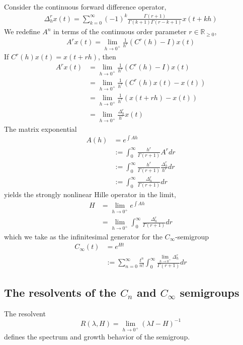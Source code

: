 \documentclass{article}
\newcommand{\R}{\mathbb{R}}
\begin{document}
Consider the continuous forward difference operator,
\begin{align*}
    \Delta^r_h x(t) = \sum_{k=0}^\infty (-1)^k \frac{\Gamma(r+1)}{\Gamma(k+1)\Gamma(r-k+1)} x(t+kh)
\end{align*}
We redefine $A^n$ in terms of the continuous order parameter $r\in\R_{\geq0}$,
\begin{align*}
    A^r x(t) = \lim_{h\rightarrow0^+} \frac{1}{h^r} (C^r(h) - I) x(t)
\end{align*}
If $C^r(h)x(t) = x(t+rh)$, then
\begin{align*}
    A^r x(t) &= \lim_{h\rightarrow0^+} \frac{1}{h^r} (C^r(h) - I) x(t)\\
    &= \lim_{h\rightarrow0^+} \frac{1}{h^r} (C^r(h)x(t) - x(t))  \\
    &= \lim_{h\rightarrow0^+} \frac{1}{h^r} (x(t+rh) - x(t)) \\
    &= \lim_{h\rightarrow0^+} \frac{\Delta^r_h }{h^r}x(t)
\end{align*}
The matrix exponential
\begin{align*}
    A(h) &= e^{\int Ah}\\
    &:= \int_0^\infty \frac{h^r}{\Gamma(r+1)} A^r dr\\
    &:= \int_0^\infty \frac{h^r}{\Gamma(r+1)} \frac{\Delta^r_h }{h^r} dr\\
    &:= \int_0^\infty \frac{\Delta^r_h}{\Gamma(r+1)} dr
\end{align*}
yields the strongly nonlinear Hille operator in the limit,
\begin{align*}
    H &= \lim_{h\rightarrow0^+}  e^{\int Ah}\\
    &=\lim_{h\rightarrow0^+} \int_0^\infty \frac{\Delta^r_h}{\Gamma(r+1)} dr
\end{align*}
which we take as the infinitesimal generator for the $C_\infty$-semigroup
\begin{align*}
    C_\infty(t) &= e^{Ht}\\
    &:= \sum_{n=0}^\infty \frac{t^n}{n!}  \int_0^\infty \frac{\lim_{h\rightarrow0^+} \Delta^r_h}{\Gamma(r+1)} dr
\end{align*}

 
\subsection{The resolvents of the $C_n$ and $C_\infty$ semigroups}

The resolvent 
$$
    R(\lambda, H) = \lim_{h\rightarrow0^+}(\lambda I - H)^{-1}
$$
defines the spectrum and growth behavior of the semigroup.
\end{document}
